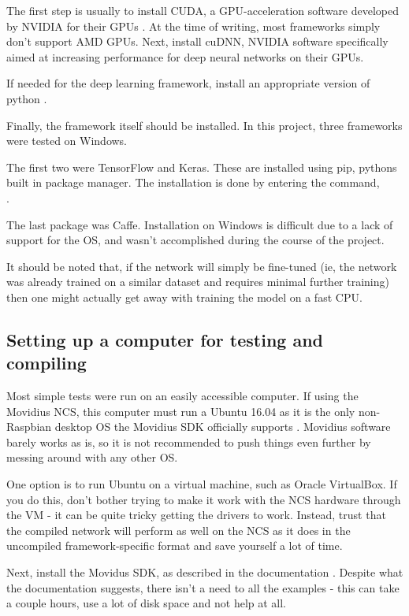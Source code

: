 The first step is usually to install CUDA, a GPU-acceleration software developed by NVIDIA for their GPUs \cite{nvidia_cuda}. At the time of writing, most frameworks simply don't support AMD GPUs. Next, install cuDNN, NVIDIA software specifically aimed at increasing performance for deep neural networks \cite{nvidia_cudnn} on their GPUs.

If needed for the deep learning framework, install an appropriate version of python \cite{python}.

Finally, the framework itself should be installed. In this project, three frameworks were tested on Windows.

The first two were TensorFlow and Keras. These are installed using pip, pythons built in package manager. The installation is done by entering the command,\\
.

The last package was Caffe. Installation on Windows is difficult due to a lack of support for the OS, and wasn't accomplished during the course of the project.

It should be noted that, if the network will simply be fine-tuned (ie, the network was already trained on a similar dataset and requires minimal further training) then one might actually get away with training the model on a fast CPU.


\subsection{Setting up a computer for testing and compiling}
Most simple tests were run on an easily accessible computer. If using the Movidius NCS, this computer must run a Ubuntu 16.04 as it is the only non-Raspbian desktop OS the Movidius SDK officially supports \cite{website:movidius_install}. Movidius software barely works as is, so it is not recommended to push things even further by messing around with any other OS.

One option is to run Ubuntu on a virtual machine, such as Oracle VirtualBox. If you do this, don't bother trying to make it work with the NCS hardware through the VM - it can be quite tricky getting the drivers to work. Instead, trust that the compiled network will perform as well on the NCS as it does in the uncompiled framework-specific format and save yourself a lot of time.

Next, install the Movidus SDK, as described in the documentation \cite{website:movidius_install}. Despite what the documentation suggests, there isn't a need to  all the examples - this can take a couple hours, use a lot of disk space and not help at all.

